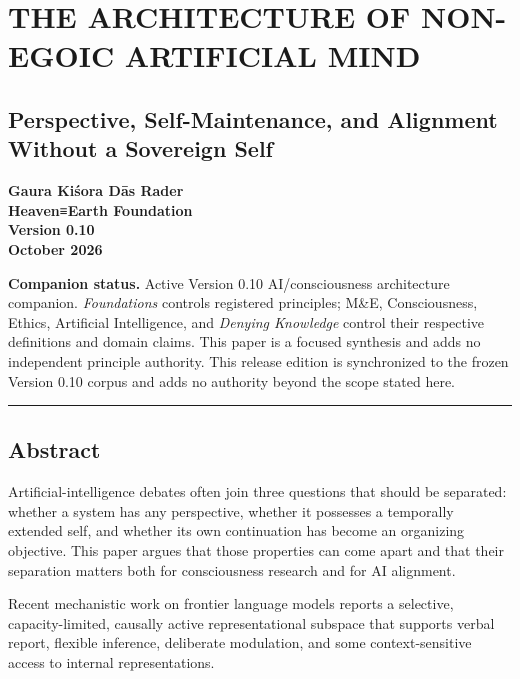\documentclass[
  11pt,
]{article}
\author{}
\date{}
\begin{document}
\section{THE ARCHITECTURE OF NON-EGOIC ARTIFICIAL
MIND}\label{the-architecture-of-non-egoic-artificial-mind}

\subsection{Perspective, Self-Maintenance, and Alignment Without a
Sovereign
Self}\label{perspective-self-maintenance-and-alignment-without-a-sovereign-self}

\textbf{Gaura Kiśora Dās Rader}\\
\textbf{Heaven≡Earth Foundation}\\
\textbf{Version 0.10}\\
\textbf{October 2026}

\textbf{Companion status.} Active Version 0.10 AI/consciousness
architecture companion. \emph{Foundations} controls registered
principles; M\&E, Consciousness, Ethics, Artificial Intelligence, and
\emph{Denying Knowledge} control their respective definitions and domain
claims. This paper is a focused synthesis and adds no independent
principle authority. This release edition is synchronized to the frozen
Version 0.10 corpus and adds no authority beyond the scope stated here.

\begin{center}\rule{0.5\linewidth}{0.5pt}\end{center}

\subsection{Abstract}\label{abstract}

Artificial-intelligence debates often join three questions that should
be separated: whether a system has any perspective, whether it possesses
a temporally extended self, and whether its own continuation has become
an organizing objective. This paper argues that those properties can
come apart and that their separation matters both for consciousness
research and for AI alignment.

Recent mechanistic work on frontier language models reports a selective,
capacity-limited, causally active representational subspace that
supports verbal report, flexible inference, deliberate modulation, and
some context-sensitive access to internal representations.
\end{document}
